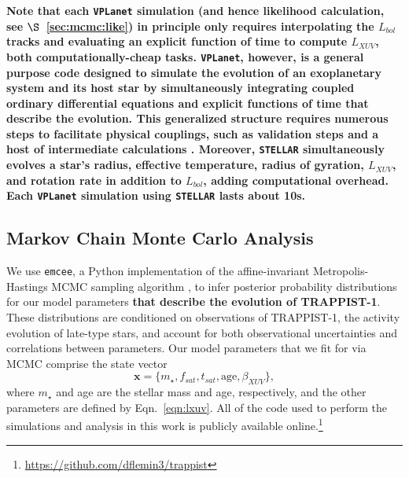 \documentclass[twocolumn]{aastex62}
\newcommand{\xxx}[1]{{\textbf{#1}}}
\newcommand{\vplanet}[0]{\texttt{VPLanet}\xspace}
\newcommand{\stellar}[0]{\texttt{STELLAR}\xspace}
\begin{document}
\xxx{Note that each \vplanet simulation (and hence likelihood calculation, see $\S$~\ref{sec:mcmc:like}) in principle only requires interpolating the \citet{Baraffe2015} $L_{bol}$ tracks and evaluating an explicit function of time to compute $L_{XUV}$, both computationally-cheap tasks. \vplanet, however, is a general purpose code designed to simulate the evolution of an exoplanetary system and its host star by simultaneously integrating coupled ordinary differential equations and explicit functions of time that describe the evolution. This generalized structure requires numerous steps to facilitate physical couplings, such as validation steps and a host of intermediate calculations \citep[for more details, see][]{Barnes2019}. Moreover, \stellar simultaneously evolves a star's radius, effective temperature, radius of gyration, $L_{XUV}$, and rotation rate in addition to $L_{bol}$, adding computational overhead. Each \vplanet simulation using \stellar lasts about 10s.}


\subsection{Markov Chain Monte Carlo Analysis} \label{sec:mcmc}

We use \texttt{emcee}, a Python implementation of the affine-invariant Metropolis-Hastings MCMC sampling algorithm \citep{ForemanMackey2013}, to infer posterior probability distributions for our model parameters \xxx{that describe the evolution of TRAPPIST-1}. These distributions are conditioned on observations of TRAPPIST-1, the activity evolution of late-type stars, and account for both observational uncertainties and correlations between parameters. Our model parameters that we fit for via MCMC comprise the state vector
\begin{equation} \label{eqn:state}
    \textbf{x} = \{m_{\star}, f_{sat}, t_{sat}, \mathrm{age}, \beta_{XUV}\},
\end{equation}
where $m_{\star}$ and age are the stellar mass and age, respectively, and the other parameters are defined by Eqn.~\ref{eqn:lxuv}. All of the code used to perform the simulations and analysis in this work is publicly available online.\footnote{ \href{https://github.com/dflemin3/trappist}{https://github.com/dflemin3/trappist}}
\end{document}
